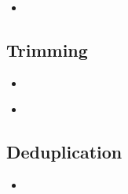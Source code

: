 \documentclass[compress, ucs, xelatex, 11pt, xcolor=x11names, aspectratio=1609,
	hyperref={
		bookmarks=true,
		unicode=true,
		colorlinks=true,
		pdftitle={HybSeq course},
		plainpages=false,
		pdfauthor={Vojtech Zeisek},
		pdfsubject={Practical processing of HybSeq target enrichment sequencing data on computing grids like MetaCentrum},
		pdfcreator={XeLaTeX},
		pdfkeywords={BASH, command line, GNU, HybSeq, Linux, MetaCentrum, sequencing shell, target enrichment},
		linkcolor=Cyan2, %
		anchorcolor=Firebrick2, %
		citecolor=Firebrick2, %
		filecolor=Firebrick2, %
		menucolor=Firebrick2, %
		urlcolor=Chartreuse2, %
		pdftex},
	url={hyphens, lowtilde} %
	]{beamer}
\begin{document}
\begin{frame}[fragile]{}
	\begin{itemize}
		\item 
	\end{itemize}
	\begin{spluscode}
    
	\end{spluscode}
	\begin{bashcode}
    
	\end{bashcode}
\end{frame}

\subsection{Trimming}

\begin{frame}[fragile]{}
	\begin{itemize}
		\item 
	\end{itemize}
	\begin{spluscode}
    
	\end{spluscode}
	\begin{bashcode}
    
	\end{bashcode}
\end{frame}

\begin{frame}[fragile]{}
	\begin{itemize}
		\item 
	\end{itemize}
	\begin{spluscode}
    
	\end{spluscode}
	\begin{bashcode}
    
	\end{bashcode}
\end{frame}

\subsection{Deduplication}

\begin{frame}[fragile]{}
	\begin{itemize}
		\item 
	\end{itemize}
	\begin{spluscode}
    
	\end{spluscode}
	\begin{bashcode}
    
	\end{bashcode}
\end{frame}
\end{document}
